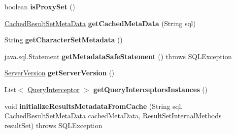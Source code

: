 \begin{DoxyCompactItemize}
boolean {\bfseries is\+Proxy\+Set} ()
\item 
\mbox{\label{interfacecom_1_1mysql_1_1cj_1_1jdbc_1_1_jdbc_connection_a248df459ef314e3a79257c7bd6dc560a}} 
\mbox{\hyperlink{interfacecom_1_1mysql_1_1cj_1_1jdbc_1_1result_1_1_cached_result_set_meta_data}{Cached\+Result\+Set\+Meta\+Data}} {\bfseries get\+Cached\+Meta\+Data} (String sql)
\item 
\mbox{\label{interfacecom_1_1mysql_1_1cj_1_1jdbc_1_1_jdbc_connection_a1bf742d4ab1a9e354ab3c810caa40481}} 
String {\bfseries get\+Character\+Set\+Metadata} ()
\item 
\mbox{\label{interfacecom_1_1mysql_1_1cj_1_1jdbc_1_1_jdbc_connection_ab48793a6beae119da08e7ae9e982c6c0}} 
java.\+sql.\+Statement {\bfseries get\+Metadata\+Safe\+Statement} ()  throws S\+Q\+L\+Exception
\item 
\mbox{\label{interfacecom_1_1mysql_1_1cj_1_1jdbc_1_1_jdbc_connection_a463e239b2b6901e85834e64ebda84d0c}} 
\mbox{\hyperlink{classcom_1_1mysql_1_1cj_1_1_server_version}{Server\+Version}} {\bfseries get\+Server\+Version} ()
\item 
\mbox{\label{interfacecom_1_1mysql_1_1cj_1_1jdbc_1_1_jdbc_connection_a06e9e0a4a916223a7b1582f10b8fdb5d}} 
List$<$ \mbox{\hyperlink{interfacecom_1_1mysql_1_1cj_1_1interceptors_1_1_query_interceptor}{Query\+Interceptor}} $>$ {\bfseries get\+Query\+Interceptors\+Instances} ()
\item 
\mbox{\label{interfacecom_1_1mysql_1_1cj_1_1jdbc_1_1_jdbc_connection_adaeb33edd797d27f3836f5cab30c51d0}} 
void {\bfseries initialize\+Results\+Metadata\+From\+Cache} (String sql, \mbox{\hyperlink{interfacecom_1_1mysql_1_1cj_1_1jdbc_1_1result_1_1_cached_result_set_meta_data}{Cached\+Result\+Set\+Meta\+Data}} cached\+Meta\+Data, \mbox{\hyperlink{interfacecom_1_1mysql_1_1cj_1_1jdbc_1_1result_1_1_result_set_internal_methods}{Result\+Set\+Internal\+Methods}} result\+Set)  throws S\+Q\+L\+Exception
\item 

\end{DoxyCompactItemize}

